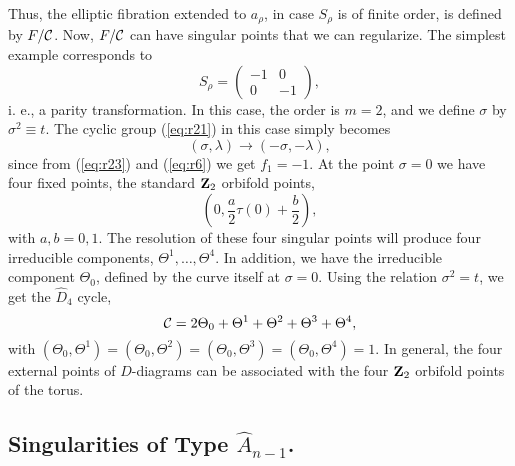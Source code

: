 Thus, the elliptic fibration extended to $a_{\rho}$, in case
$S_{\rho}$ is of finite order, is defined by $F/{\cal C}$. Now,
$F/{\cal C}$ can have singular points that we can regularize. The
simplest example corresponds to
\begin{equation}
S_{\rho} = \left( \begin{array}{cc} -1 & 0 \\ 0 & -1 \end{array}
\right),
\label{eq:r23}
\end{equation}
i. e., a parity transformation. In this case, the order is $m=2$,
and we define $\sigma$ by $\sigma^2 \equiv t$. The cyclic 
group (\ref{eq:r21}) in this case simply becomes
\begin{equation}
(\sigma, \lambda) \rightarrow (- \sigma, -\lambda),
\label{eq:r24}
\end{equation}
since from (\ref{eq:r23}) and (\ref{eq:r6}) we get $f_1=-1$. At the point 
$\sigma=0$ we have four fixed points, the standard ${\bf Z}_2$ 
orbifold points,
\begin{equation}
(0,\frac {a}{2}\tau(0)+ \frac {b}{2}),
\label{eq:r25}
\end{equation}
with $a,b=0,1$. The resolution of these four singular points will produce 
four irreducible components, $\Theta^1, \ldots, \Theta^4$. In addition, 
we have the irreducible component $\Theta_0$, defined by the curve itself 
at $\sigma=0$. Using the relation $\sigma^2=t$, we get the $\hat{D}_4$ cycle, 
\begin{equation}
{\cal C} = 2 \Theta_0 + \Theta^1 + \Theta^2 + \Theta^3 + \Theta^4,
\label{eq:r26}
\end{equation}
with $(\Theta_0,\Theta^1)=(\Theta_0,\Theta^2)=(\Theta_0,\Theta^3)=
(\Theta_0,\Theta^4)=1$. In general, the four external points of $D$-diagrams 
can be associated with the four ${\bf Z}_2$ orbifold points of the torus. 

\subsection{Singularities of Type $\hat{A}_{n-1}$.}

